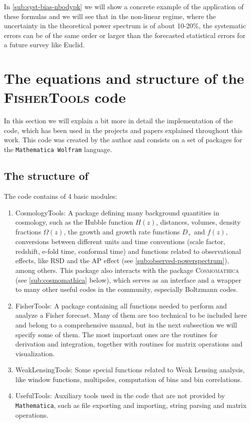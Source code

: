 In \cref{sub:syst-bias-nbodypk} we will show a concrete example of the application of these formulas
and we will see that in the non-linear regime, where the uncertainty in 
the theoretical power spectrum is of about 10-20\%, the systematic
errors can be of the same order or larger than the forecasted statistical errors for a future survey like Euclid.


\section{The equations and structure of the \textsc{FisherTools} code \label{sec:FisherTools-code}}

In this section we will explain a bit more in detail the 
implementation of the  \fito code, which has been used in the projects and papers
explained throughout this work.
This code was created by the author and consists on a set of packages for the \texttt{Mathematica Wolfram}
language.

\subsection{The structure of \fito \label{sub:fishertools}}

The code contains of 4 basic modules:
\begin{enumerate}
	\item CosmologyTools: A package defining many background quantities in cosmology, such as the Hubble function
	$H(z)$, distances, volumes, density fractions $\Omega(z)$, the growth and growth rate functions $D_{+}$ and $f(z)$,
	conversions between different units and time conventions (scale factor, redshift, e-fold time, conformal time) and functions
	related to observational effects, like RSD and the AP effect (see \cref{sub:observed-powerspectrum}), among others.
	This package also interacts with the package \textsc{Cosmomathica} (see \cref{sub:cosmomathica} below), which 
	serves as an interface and a wrapper to many other useful codes in the community,
	especially Boltzmann codes.
	\item FisherTools: A package containing all functions needed to perform and analyze a Fisher forecast. Many of them
	are too technical to be included here and belong to a comprehensive manual, but in the next subsection we will specify some of them.
	The most important ones are the routines for derivation and integration, together with routines for matrix operations and 
	visualization.
	\item WeakLensingTools: Some special functions related to Weak Lensing analysis, like window functions, multipoles,
	computation of bins and bin correlations.
	\item UsefulTools: Auxiliary tools used in the code that are not provided by \texttt{Mathematica},
	such as file exporting and importing, string parsing and matrix operations.
\end{enumerate}

